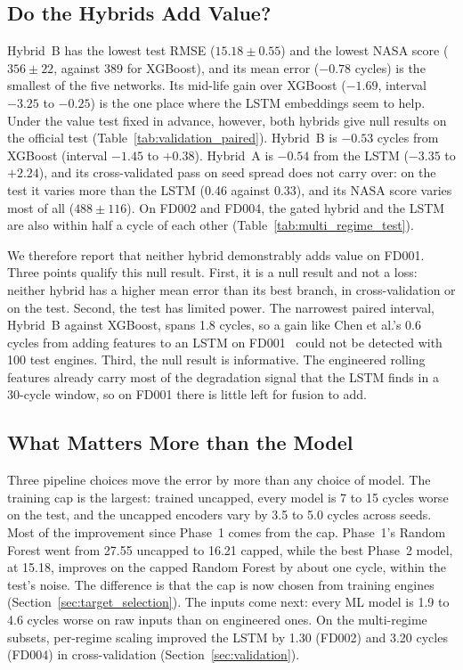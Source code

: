 \subsection{Do the Hybrids Add Value?}
Hybrid~B has the lowest test RMSE ($15.18\pm0.55$) and the lowest NASA score
($356\pm22$, against 389 for XGBoost), and its mean error ($-0.78$ cycles) is
the smallest of the five networks. Its mid-life gain over XGBoost ($-1.69$,
interval $-3.25$ to $-0.25$) is the one place where the LSTM embeddings seem to
help. Under the value test fixed in advance, however, both hybrids give null
results on the official test (Table~\ref{tab:validation_paired}). Hybrid~B is
$-0.53$ cycles from XGBoost (interval $-1.45$ to $+0.38$). Hybrid~A is $-0.54$
from the LSTM ($-3.35$ to $+2.24$), and its cross-validated pass on seed spread
does not carry over: on the test it varies more than the LSTM (0.46 against
0.33), and its NASA score varies most of all ($488\pm116$). On FD002 and
FD004, the gated hybrid and the LSTM are also within half a cycle of each
other (Table~\ref{tab:multi_regime_test}).

We therefore report that neither hybrid demonstrably adds value on FD001.
Three points qualify this null result. First, it is a null result and not a
loss: neither hybrid has a higher mean error than its best branch, in
cross-validation or on the test. Second, the test has limited power. The
narrowest paired interval, Hybrid~B against XGBoost, spans 1.8 cycles, so a
gain like Chen et al.'s 0.6 cycles from adding features to an LSTM on
FD001~\cite{Chen2021machine} could not be detected with 100 test engines.
Third, the null result is informative. The engineered rolling features
already carry most of the degradation signal that the LSTM finds in a
30-cycle window, so on FD001 there is little left for fusion to add.

\subsection{What Matters More than the Model}
Three pipeline choices move the error by more than any choice of model. The
training cap is the largest: trained uncapped, every model is 7 to 15 cycles
worse on the test, and the uncapped encoders vary by 3.5 to 5.0 cycles across
seeds. Most of the improvement since Phase~1 comes from the cap. Phase~1's
Random Forest went from 27.55 uncapped to 16.21 capped, while the best Phase~2
model, at 15.18, improves on the capped Random Forest by about one cycle,
within the test's noise. The difference is that the cap is now chosen from
training engines (Section~\ref{sec:target_selection}). The inputs come next:
every ML model is 1.9 to 4.6 cycles worse on raw inputs than on engineered
ones. On the multi-regime subsets, per-regime scaling improved the LSTM by
1.30 (FD002) and 3.20 cycles (FD004) in cross-validation
(Section~\ref{sec:validation}).

